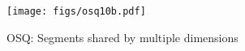 \begin{figure}[]{}
    \centering
    \texttt{[image: figs/osq10b.pdf]}
    \caption{OSQ: Segments shared by multiple dimensions}
    \label{fig:subfig-osq-b}
\end{figure}